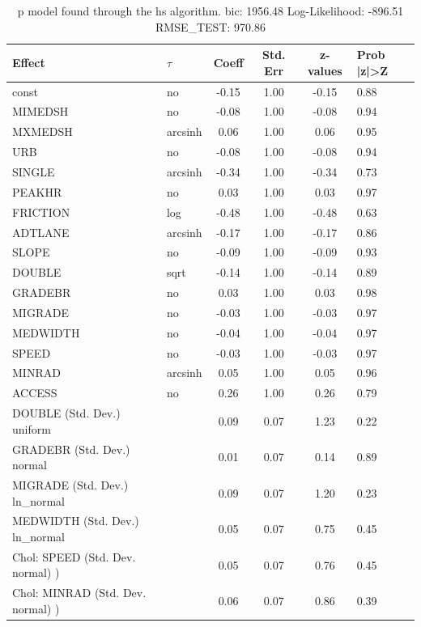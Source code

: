 \begin{table}
	\caption{p model found through the hs algorithm. bic: 1956.48 Log-Likelihood: -896.51 RMSE_TEST: 970.86}
	\begin{center}
		\begin{tabular}{|l|l|c|c|c|l|}
			\hline
			Effect & $\tau$ & Coeff & Std. Err & z-values & Prob |z|>Z \\
			\hline
			const & no & -0.15 & 1.00 & -0.15 & 0.88 \\
			\hline
			MIMEDSH & no & -0.08 & 1.00 & -0.08 & 0.94 \\
			\hline
			MXMEDSH & arcsinh & 0.06 & 1.00 & 0.06 & 0.95 \\
			\hline
			URB & no & -0.08 & 1.00 & -0.08 & 0.94 \\
			\hline
			SINGLE & arcsinh & -0.34 & 1.00 & -0.34 & 0.73 \\
			\hline
			PEAKHR & no & 0.03 & 1.00 & 0.03 & 0.97 \\
			\hline
			FRICTION & log & -0.48 & 1.00 & -0.48 & 0.63 \\
			\hline
			ADTLANE & arcsinh & -0.17 & 1.00 & -0.17 & 0.86 \\
			\hline
			SLOPE & no & -0.09 & 1.00 & -0.09 & 0.93 \\
			\hline
			DOUBLE & sqrt & -0.14 & 1.00 & -0.14 & 0.89 \\
			\hline
			GRADEBR & no & 0.03 & 1.00 & 0.03 & 0.98 \\
			\hline
			MIGRADE & no & -0.03 & 1.00 & -0.03 & 0.97 \\
			\hline
			MEDWIDTH & no & -0.04 & 1.00 & -0.04 & 0.97 \\
			\hline
			SPEED & no & -0.03 & 1.00 & -0.03 & 0.97 \\
			\hline
			MINRAD & arcsinh & 0.05 & 1.00 & 0.05 & 0.96 \\
			\hline
			ACCESS & no & 0.26 & 1.00 & 0.26 & 0.79 \\
			\hline
			DOUBLE (Std. Dev.) uniform &  & 0.09 & 0.07 & 1.23 & 0.22 \\
			\hline
			GRADEBR (Std. Dev.) normal &  & 0.01 & 0.07 & 0.14 & 0.89 \\
			\hline
			MIGRADE (Std. Dev.) ln_normal &  & 0.09 & 0.07 & 1.20 & 0.23 \\
			\hline
			MEDWIDTH (Std. Dev.) ln_normal &  & 0.05 & 0.07 & 0.75 & 0.45 \\
			\hline
			 Chol: SPEED (Std. Dev. normal) ) &  & 0.05 & 0.07 & 0.76 & 0.45 \\
			\hline
			 Chol: MINRAD (Std. Dev. normal) ) &  & 0.06 & 0.07 & 0.86 & 0.39 \\

\end{tabular}
\end{center}
\end{table}
